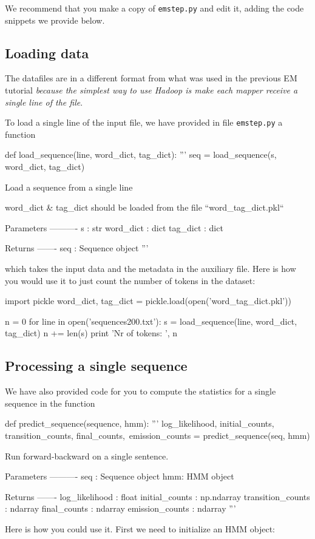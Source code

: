 We recommend that you make a copy of \verb+emstep.py+ and edit it, adding the code snippets we provide below.

\subsection{Loading data}

The datafiles are in a different format from what was used in the previous EM
tutorial \emph{because the simplest way to use Hadoop is make each mapper
receive a single line of the file}.

To load a single line of the input file, we have provided in file {\texttt{emstep.py}} a function
\begin{python}
def load_sequence(line, word_dict, tag_dict):
    '''
    seq = load_sequence(s, word_dict, tag_dict)

    Load a sequence from a single line

    word_dict & tag_dict should be loaded from the file ``word_tag_dict.pkl``

    Parameters
    ----------
    s : str
    word_dict : dict
    tag_dict : dict

    Returns
    -------
    seq : Sequence object
    '''
\end{python}
which takes the
input data and the metadata in the auxiliary file. Here is how you would use it
to just count the number of tokens in the dataset:

\begin{python}
import pickle
word_dict, tag_dict = pickle.load(open('word_tag_dict.pkl'))

n = 0
for line in open('sequences200.txt'):
    s = load_sequence(line, word_dict, tag_dict)
    n += len(s)
print 'Nr of tokens: ', n
\end{python}

\subsection{Processing a single sequence}

We have also provided code for you to compute the statistics for a single
sequence in the function 
\begin{python}
def predict_sequence(sequence, hmm):
    '''
    log_likelihood, initial_counts, transition_counts, final_counts,\
            emission_counts = predict_sequence(seq, hmm)

    Run forward-backward on a single sentence.

    Parameters
    ----------
    seq : Sequence object
    hmm: HMM object

    Returns
    -------
    log_likelihood : float
    initial_counts : np.ndarray
    transition_counts : ndarray
    final_counts : ndarray
    emission_counts : ndarray
    '''
\end{python}
Here is how you
could use it. First we need to initialize an HMM object:

